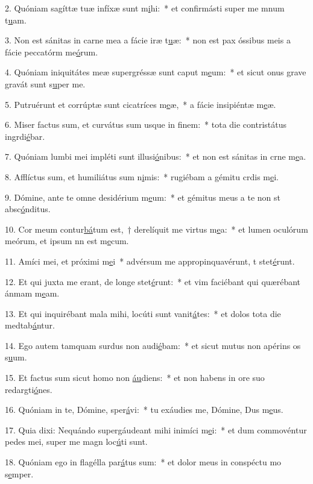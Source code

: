 2. Quóniam sagíttæ tuæ infíxæ sunt m\uline{i}hi:~* et confirmásti super me mnum t\uline{u}am.\par 
3. Non est sánitas in carne mea a fácie iræ t\uline{u}æ:~* non est pax óssibus meis a fácie peccatórm me\uline{ó}rum.\par 
4. Quóniam iniquitátes meæ supergréssæ sunt caput m\uline{e}um:~* et sicut onus grave gravát sunt s\uline{u}per me.\par 
5. Putruérunt et corrúptæ sunt cicatríces m\uline{e}æ,~* a fácie insipiéntæ m\uline{e}æ.\par 
6. Miser factus sum, et curvátus sum usque in f\uline{i}nem:~* tota die contristátus ingrdi\uline{é}bar.\par 
7. Quóniam lumbi mei impléti sunt illusi\uline{ó}nibus:~* et non est sánitas in crne m\uline{e}a.\par 
8. Afflíctus sum, et humiliátus sum n\uline{i}mis:~* rugiébam a gémitu crdis m\uline{e}i.\par 
9. Dómine, ante te omne desidérium m\uline{e}um:~* et gémitus meus a te non st absc\uline{ó}nditus.\par 
10. Cor meum contur\uline{bá}tum est,~† derelíquit me virtus m\uline{e}a:~* et lumen oculórum meórum, et ipsum nn est m\uline{e}cum.\par 
11. Amíci mei, et próximi m\uline{e}i~* advérsum me appropinquavérunt, t stet\uline{é}runt.\par 
12. Et qui juxta me erant, de longe stet\uline{é}runt:~* et vim faciébant qui quærébant ánmam m\uline{e}am.\par 
13. Et qui inquirébant mala mihi, locúti sunt vanit\uline{á}tes:~* et dolos tota die medtab\uline{á}ntur.\par 
14. Ego autem tamquam surdus non audi\uline{é}bam:~* et sicut mutus non apérins os s\uline{u}um.\par 
15. Et factus sum sicut homo non \uline{áu}diens:~* et non habens in ore suo redargti\uline{ó}nes.\par 
16. Quóniam in te, Dómine, sper\uline{á}vi:~* tu exáudies me, Dómine, Dus m\uline{e}us.\par 
17. Quia dixi: Nequándo supergáudeant mihi inimíci m\uline{e}i:~* et dum commovéntur pedes mei, super me magn loc\uline{ú}ti sunt.\par 
18. Quóniam ego in flagélla par\uline{á}tus sum:~* et dolor meus in conspéctu mo s\uline{e}mper.\par 
